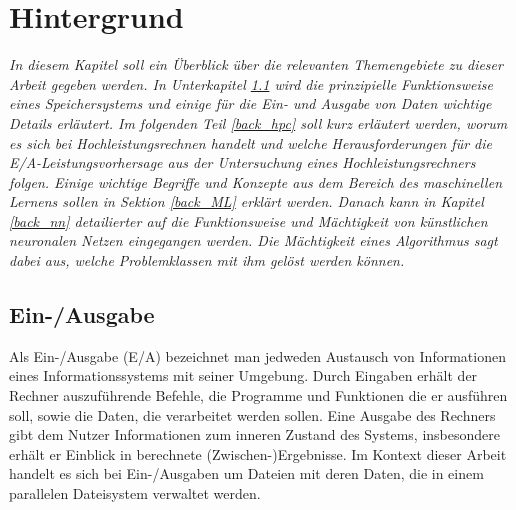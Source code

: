 \documentclass[
	12pt,
	a4paper,
	BCOR10mm,
	DIV14,
	listof=totoc,
	bibliography=totoc,
	headsepline
]{scrreprt}
\begin{document}
\chapter{Hintergrund}
\label{Hintergrund}
\textit{
	In diesem Kapitel soll ein Überblick über die relevanten Themengebiete zu dieser Arbeit gegeben werden.
	In Unterkapitel \ref{back_E/A} wird die prinzipielle Funktionsweise eines Speichersystems und einige für die Ein- und Ausgabe von Daten wichtige Details erläutert.
	Im folgenden Teil \ref{back_hpc} soll kurz erläutert werden, worum es sich bei Hochleistungsrechnen handelt und welche Herausforderungen für die E/A-Leistungsvorhersage aus der Untersuchung eines Hochleistungsrechners folgen.
	Einige wichtige Begriffe und Konzepte aus dem Bereich des maschinellen Lernens sollen in Sektion \ref{back_ML} erklärt werden.
	Danach kann in Kapitel \ref{back_nn} detailierter auf die Funktionsweise und Mächtigkeit von künstlichen neuronalen Netzen eingegangen werden. Die Mächtigkeit eines Algorithmus sagt dabei aus, welche Problemklassen mit ihm gelöst werden können. 
}
\bigskip

\section{Ein-/Ausgabe}
\label{back_E/A}
Als Ein-/Ausgabe (E/A) bezeichnet man jedweden Austausch von Informationen eines Informationssystems mit seiner Umgebung. Durch Eingaben erhält der Rechner auszuführende Befehle, die Programme und Funktionen die er ausführen soll, sowie die Daten, die verarbeitet werden sollen.
Eine Ausgabe des Rechners gibt dem Nutzer Informationen zum inneren Zustand des Systems, insbesondere erhält er Einblick in berechnete (Zwischen-)Ergebnisse.  
Im Kontext dieser Arbeit handelt es sich bei Ein-/Ausgaben um Dateien mit deren Daten, die in einem parallelen Dateisystem verwaltet werden.
\medskip
\end{document}
